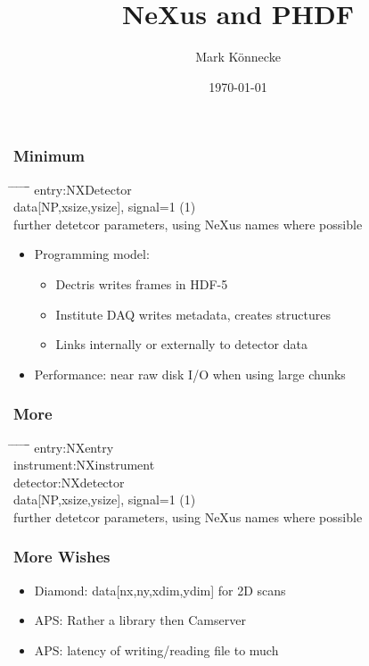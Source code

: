 \documentclass{beamer}
\title{NeXus and PHDF}
\author{Mark K\"onnecke }
\institute{Paul Scherrer Institute\\Switzerland }
\date{\today}
\begin{document}


\begin{frame} \frametitle{Minimum}
\begin{tabbing}
\hspace*{1cm} \= \hspace*{1cm} \= \hspace*{1cm} \= \hspace*{1cm} \= \hspace*{1cm} \= \hspace*{1cm}\= \kill
entry:NXDetector \\
  \>data[NP,xsize,ysize], signal=1 (1)\\
  \>further detetcor parameters, using NeXus names where possible\\
\end{tabbing}
\begin{itemize}
\item Programming model:
\begin{itemize}
\item Dectris writes frames in HDF-5
\item Institute DAQ writes metadata, creates structures
\item Links internally or externally to detector data
\end{itemize}
\item Performance: near raw disk I/O when using large chunks
\end{itemize}
\end{frame}

\begin{frame} \frametitle{More}
\begin{tabbing}
\hspace*{1cm} \= \hspace*{1cm} \= \hspace*{1cm} \= \hspace*{1cm} \= \hspace*{1cm} \= \hspace*{1cm}\= \kill
entry:NXentry \\
 \>instrument:NXinstrument\\
 \> \> detector:NXdetector \\
 \> \> \>data[NP,xsize,ysize], signal=1 (1)\\
 \> \> \>further detetcor parameters, using NeXus names where possible\\
\end{tabbing}
\end{frame}

\begin{frame}
\frametitle{More Wishes}
\begin{itemize}
\item Diamond: data[nx,ny,xdim,ydim] for 2D scans
\item APS: Rather a library then Camserver
\item APS: latency of writing/reading file to much
\end{itemize}
\end{frame}
\end{document}
